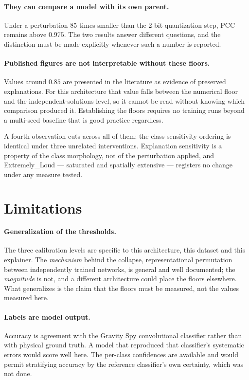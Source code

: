 \paragraph{They can compare a model with its own parent.} Under a perturbation 85
times smaller than the 2-bit quantization step, PCC remains above $0.975$. The
two results answer different questions, and the distinction must be made
explicitly whenever such a number is reported.

\paragraph{Published figures are not interpretable without these floors.} Values
around $0.85$ are presented in the literature as evidence of preserved
explanations. For this architecture that value falls between the numerical floor
and the independent-solutions level, so it cannot be read without knowing which
comparison produced it. Establishing the floors requires no training runs beyond
a multi-seed baseline that is good practice regardless.

A fourth observation cuts across all of them: the class sensitivity ordering is
identical under three unrelated interventions. Explanation sensitivity is a
property of the class morphology, not of the perturbation applied, and
Extremely\_Loud --- saturated and spatially extensive --- registers no change
under any measure tested.

\section{Limitations}

\paragraph{Generalization of the thresholds.} The three calibration levels are
specific to this architecture, this dataset and this explainer. The
\emph{mechanism} behind the collapse, representational permutation between
independently trained networks, is general and well documented; the
\emph{magnitude} is not, and a different architecture could place the floors
elsewhere. What generalizes is the claim that the floors must be measured, not
the values measured here.

\paragraph{Labels are model output.} Accuracy is agreement with the Gravity Spy
convolutional classifier rather than with physical ground truth. A model that
reproduced that classifier's systematic errors would score well here. The
per-class confidences are available and would permit stratifying accuracy by the
reference classifier's own certainty, which was not done.

